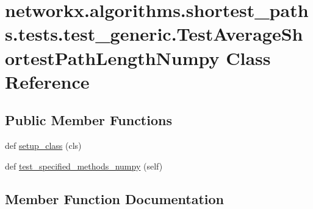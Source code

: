 \hypertarget{classnetworkx_1_1algorithms_1_1shortest__paths_1_1tests_1_1test__generic_1_1TestAverageShortestPathLengthNumpy}{}\section{networkx.\+algorithms.\+shortest\+\_\+paths.\+tests.\+test\+\_\+generic.\+Test\+Average\+Shortest\+Path\+Length\+Numpy Class Reference}
\label{classnetworkx_1_1algorithms_1_1shortest__paths_1_1tests_1_1test__generic_1_1TestAverageShortestPathLengthNumpy}
\subsection*{Public Member Functions}
\begin{DoxyCompactItemize}
\item 
def \hyperlink{classnetworkx_1_1algorithms_1_1shortest__paths_1_1tests_1_1test__generic_1_1TestAverageShortestPathLengthNumpy_af4b3e79f1af97e2e1ccd4af367b746e6}{setup\+\_\+class} (cls)
\item 
def \hyperlink{classnetworkx_1_1algorithms_1_1shortest__paths_1_1tests_1_1test__generic_1_1TestAverageShortestPathLengthNumpy_accb3ee2afa5911ece3dca8cca3e3d283}{test\+\_\+specified\+\_\+methods\+\_\+numpy} (self)
\end{DoxyCompactItemize}


\subsection{Member Function Documentation}
\mbox{\label{classnetworkx_1_1algorithms_1_1shortest__paths_1_1tests_1_1test__generic_1_1TestAverageShortestPathLengthNumpy_af4b3e79f1af97e2e1ccd4af367b746e6}} 
